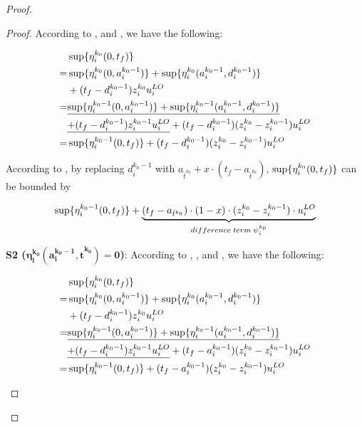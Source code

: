 \documentclass[10pt,journal,compsoc]{IEEEtran}
\begin{document}
\begin{proof}
\begin{proof}
According to  ,  and ,  we have the following:
\begin{small}
\begin{align*}
	&\sup\{\eta_i^{k_0}(0,t_f)\} \nonumber \\
=&\sup\{\eta_i^{k_0}(0,a_i^{k_0-1})\}+\sup\{\eta_i^{k_0}(a_i^{k_0-1},d_i^{k_0-1})\} \nonumber  \\
&+(t_f-d_i^{k_0-1}){z_i^{k_0}}{u_i^{LO}} \nonumber  \\
=&\underline{\sup\{\eta_i^{k_0-1}(0,a_i^{k_0-1})\}+\sup\{\eta_i^{k_0-1}(a_i^{k_0-1},d_i^{k_0-1})\}} \nonumber \\
 &\underline{+(t_f-d_i^{k_0-1}){z_i^{k_0-1}}{u_i^{LO}}}+(t_f-d_i^{k_0-1}){(z_i^{k_0}-z_i^{k_0-1})}{u_i^{LO}} \nonumber \\
=&\sup\{\eta_i^{k_0-1}(0,t_f)\}+(t_f-d_i^{k_0-1}){(z_i^{k_0}-z_i^{k_0-1})}{u_i^{LO}}
\end{align*}
\end{small}

According to , by replacing $d_i^{k_0-1}$ with $a_{\hat{t}^{k_0}}+x\cdot{(t_f-a_{\hat{t}^{k_0}})}$, $\sup\{\eta_i^{k_0}(0,t_f)\}$ can be bounded by
\begin{small}
\begin{align}
\sup\{\eta_i^{k_0-1}(0,t_f)\}+\underbrace{(t_f-a_{\hat{t}^{k_0}})\cdot(1-x)\cdot{(z_i^{k_0}-z_i^{k_0-1})}\cdot{u_i^{LO}}}_{difference\;term\;\psi_i^{k_0}}
\label{eq:lema_diff1_3}
\end{align} 
\end{small} 

\noindent\textbf{S2 ($\mathbf{\eta_i^{k_0}(a_i^{k_0-1},\hat{t}^{k_0})={0}}$)}:
According to  ,  , and ,  we have the following:
\begin{small}
\begin{align*}
	&\sup\{\eta_i^{k_0}(0,t_f)\} \nonumber \\
=&\sup\{\eta_i^{k_0}(0,a_i^{k_0-1})\}+\sup\{\eta_i^{k_0}(a_i^{k_0-1},d_i^{k_0-1})\} \nonumber  \\
&+(t_f-d_i^{k_0-1})z_i^{k_0}u_i^{LO} \nonumber  \\
=&\underline{\sup\{\eta_i^{k_0-1}(0,a_i^{k_0-1})\}+\sup\{\eta_i^{k_0-1}(a_i^{k_0-1},d_i^{k_0-1})\}} \nonumber \\
 &\underline{+(t_f-d_i^{k_0-1})z_i^{k_0-1}u_i^{LO}}+(t_f-a_i^{k_0-1}){(z_i^{k_0}-z_i^{k_0-1})}{u_i^{LO}} \nonumber \\
=&\sup\{\eta_i^{k_0-1}(0,t_f)\}+(t_f-a_i^{k_0-1}){(z_i^{k_0}-z_i^{k_0-1})}{u_i^{LO}}
\end{align*}
\end{small}


\end{proof}
\end{proof}
\end{document}
